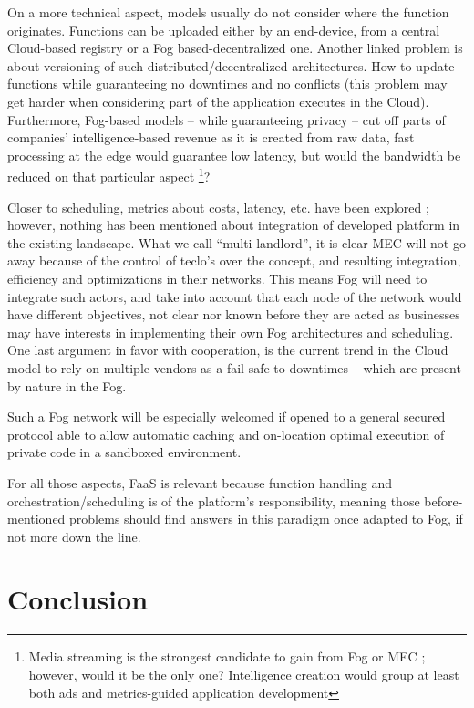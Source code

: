 \documentclass[11pt]{sdm}
\begin{document}
On a more technical aspect, models usually do not consider where the function originates. Functions can be uploaded either by an end-device, from a central Cloud-based registry or a Fog based-decentralized one. Another linked problem is about versioning of such distributed/decentralized architectures. How to update functions while guaranteeing no downtimes and no conflicts (this problem may get harder when considering part of the application executes in the Cloud). Furthermore, Fog-based models -- while guaranteeing privacy -- cut off parts of companies' intelligence-based revenue as it is created from raw data, fast processing at the edge would guarantee low latency, but would the bandwidth be reduced on that particular aspect \footnote{Media streaming is the strongest candidate to gain from Fog or \gls{MEC} ; however, would it be the only one? Intelligence creation would group at least both ads and metrics-guided application development}?

Closer to scheduling, metrics about costs, latency, etc. have been explored ; however, nothing has been mentioned about integration of developed platform in the existing landscape. What we call ``multi-landlord'', it is clear \gls{MEC} will not go away because of the control of teclo's over the concept, and resulting integration, efficiency and optimizations in their networks. This means Fog will need to integrate such actors, and take into account that each node of the network would have different objectives, not clear nor known before they are acted as businesses may have interests in implementing their own Fog architectures and scheduling. One last argument in favor with cooperation, is the current trend in the Cloud model to rely on multiple vendors as a fail-safe to downtimes -- which are present by nature in the Fog.

Such a Fog network will be especially welcomed if opened to a general secured protocol able to allow automatic caching and on-location optimal execution of private code in a sandboxed environment.

For all those aspects, \gls{FaaS} is relevant because function handling and orchestration/scheduling is of the platform's responsibility, meaning those before-mentioned problems should find answers in this paradigm once adapted to Fog, if not more down the line.



\section{Conclusion}

\printbibliography 
\end{document}
